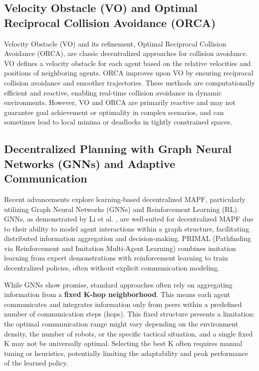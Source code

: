 \subsection{Velocity Obstacle (VO) and Optimal Reciprocal Collision Avoidance (ORCA)}
Velocity Obstacle (VO) \cite{VanDenBerg2008ORCA}
and its refinement, Optimal Reciprocal Collision Avoidance (ORCA), are classic decentralized approaches for collision avoidance. VO defines a velocity obstacle for each agent based on the relative velocities and positions of neighboring agents. ORCA improves upon VO by ensuring reciprocal collision avoidance and smoother trajectories. These methods are computationally efficient and reactive, enabling real-time collision avoidance in dynamic environments. However, VO and ORCA are primarily reactive and may not guarantee goal achievement or optimality in complex scenarios, and can sometimes lead to local minima or deadlocks in tightly constrained spaces.

\subsection{Decentralized Planning with Graph Neural Networks (GNNs) and Adaptive Communication}
Recent advancements explore learning-based decentralized MAPF, particularly utilizing Graph Neural Networks (GNNs) and Reinforcement Learning (RL). GNNs, as demonstrated by Li et al. \cite{Li2021GNNCoordination},
are well-suited for decentralized MAPF due to their ability to model agent interactions within a graph structure, facilitating distributed information aggregation and decision-making. PRIMAL (Pathfinding via Reinforcement and Imitation Multi-Agent Learning) \cite{Sartoretti2019Primal} combines imitation learning from expert demonstrations with reinforcement learning to train decentralized policies, often without explicit communication modeling.

While GNNs show promise, standard approaches often rely on aggregating information from a \textbf{fixed K-hop neighborhood}. This means each agent communicates and integrates information only from peers within a predefined number of communication steps (hops). This fixed structure presents a limitation: the optimal communication range might vary depending on the environment density, the number of robots, or the specific tactical situation, and a single fixed K may not be universally optimal. Selecting the best K often requires manual tuning or heuristics, potentially limiting the adaptability and peak performance of the learned policy.

